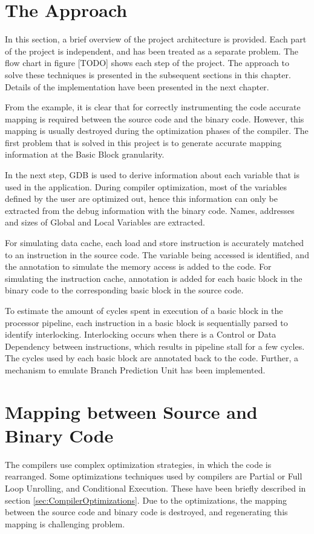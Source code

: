 \section{The Approach}
In this section, a brief overview of the project architecture is provided. Each part of the project is independent, and has been treated as a separate problem. The flow chart in figure [TODO] shows each step of the project. The approach to solve these techniques is presented in the subsequent sections in this chapter. Details of the implementation have been presented in the next chapter.

From the example, it is clear that for correctly instrumenting the code accurate mapping is required between the source code and the binary code. However, this mapping is usually destroyed during the optimization phases of the compiler. The first problem that is solved in this project is to generate accurate mapping information at the Basic Block granularity. 

In the next step, GDB is used to derive information about each variable that is used in the application. During compiler optimization, most of the variables defined by the user are optimized out, hence this information can only be extracted from the debug information with the binary code. Names, addresses and sizes of Global and Local Variables are extracted.

For simulating data cache, each load and store instruction is accurately matched to an instruction in the source code. The variable being accessed is identified, and the annotation to simulate the memory access is added to the code. For simulating the instruction cache, annotation is added for each basic block in the binary code to the corresponding basic block in the source code.

To estimate the amount of cycles spent in execution of a basic block in the processor pipeline, each instruction in a basic block is sequentially parsed to identify interlocking. Interlocking occurs when there is a Control or Data Dependency between instructions, which results in pipeline stall for a few cycles. The cycles used by each basic block are annotated back to the code. Further, a mechanism to emulate Branch Prediction Unit has been implemented. 

\section{Mapping between Source and Binary Code}
The compilers use complex optimization strategies, in which the code is rearranged. Some optimizations techniques used by compilers are Partial or Full Loop Unrolling, and Conditional Execution. These have been briefly described in section \ref{sec:CompilerOptimizations}. Due to the optimizations, the mapping between the source code and binary code is destroyed, and regenerating this mapping is challenging problem.

